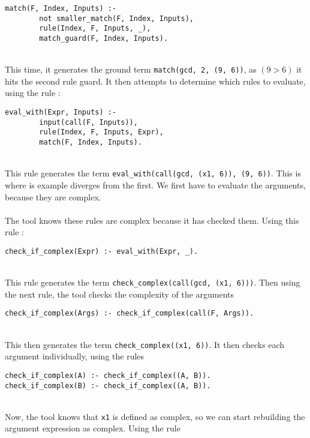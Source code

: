 \begin{lstlisting}[firstnumber=197]
match(F, Index, Inputs) :-
		not smaller_match(F, Index, Inputs), 
		rule(Index, F, Inputs, _), 
		match_guard(F, Index, Inputs).
\end{lstlisting}
\mbox{} \\
This time, it generates the ground term \lstinline{match(gcd, 2, (9, 6))}, as $(9 > 6)$ it hits the second rule guard. It then attempts to determine which rules to evaluate, using the rule : \\ %

\begin{lstlisting}[firstnumber=128]
eval_with(Expr, Inputs) :- 
		input(call(F, Inputs)), 
		rule(Index, F, Inputs, Expr), 
		match(F, Index, Inputs).
\end{lstlisting}
\mbox{} \\
This rule generates the term \lstinline!eval_with(call(gcd, (x1, 6)), (9, 6))!. This is where is example diverges from the first. We first have to evaluate the arguments, because they are complex. \\ \\
The tool knows these rules are complex because it has checked them. Using this rule : \\

\begin{lstlisting}[firstnumber=149]
check_if_complex(Expr) :- eval_with(Expr, _).
\end{lstlisting}
\mbox{} \\
This rule generates the term \lstinline!check_complex(call(gcd, (x1, 6)))!. Then using the next rule, the tool checks the complexity of the arguments \\

\begin{lstlisting}[firstnumber=151]
check_if_complex(Args) :- check_if_complex(call(F, Args)).
\end{lstlisting}
\mbox{} \\
This then generates the term \lstinline!check_complex((x1, 6))!. It then checks each argument individually, using the rules  \\

\begin{lstlisting}[firstnumber=152]
check_if_complex(A) :- check_if_complex((A, B)).
check_if_complex(B) :- check_if_complex((A, B)).
\end{lstlisting}
\mbox{} \\
Now, the tool knows that \lstinline!x1! is defined as complex, so we can start rebuilding the argument expression as complex. Using the rule  \\

